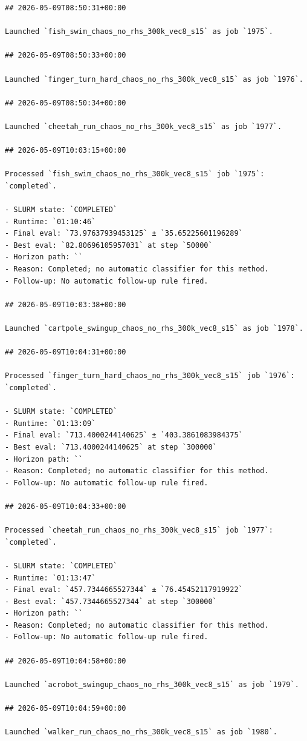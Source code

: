 \begin{verbatim}
## 2026-05-09T08:50:31+00:00

Launched `fish_swim_chaos_no_rhs_300k_vec8_s15` as job `1975`.

## 2026-05-09T08:50:33+00:00

Launched `finger_turn_hard_chaos_no_rhs_300k_vec8_s15` as job `1976`.

## 2026-05-09T08:50:34+00:00

Launched `cheetah_run_chaos_no_rhs_300k_vec8_s15` as job `1977`.

## 2026-05-09T10:03:15+00:00

Processed `fish_swim_chaos_no_rhs_300k_vec8_s15` job `1975`: `completed`.

- SLURM state: `COMPLETED`
- Runtime: `01:10:46`
- Final eval: `73.97637939453125` ± `35.65225601196289`
- Best eval: `82.80696105957031` at step `50000`
- Horizon path: ``
- Reason: Completed; no automatic classifier for this method.
- Follow-up: No automatic follow-up rule fired.

## 2026-05-09T10:03:38+00:00

Launched `cartpole_swingup_chaos_no_rhs_300k_vec8_s15` as job `1978`.

## 2026-05-09T10:04:31+00:00

Processed `finger_turn_hard_chaos_no_rhs_300k_vec8_s15` job `1976`: `completed`.

- SLURM state: `COMPLETED`
- Runtime: `01:13:09`
- Final eval: `713.4000244140625` ± `403.3861083984375`
- Best eval: `713.4000244140625` at step `300000`
- Horizon path: ``
- Reason: Completed; no automatic classifier for this method.
- Follow-up: No automatic follow-up rule fired.

## 2026-05-09T10:04:33+00:00

Processed `cheetah_run_chaos_no_rhs_300k_vec8_s15` job `1977`: `completed`.

- SLURM state: `COMPLETED`
- Runtime: `01:13:47`
- Final eval: `457.7344665527344` ± `76.45452117919922`
- Best eval: `457.7344665527344` at step `300000`
- Horizon path: ``
- Reason: Completed; no automatic classifier for this method.
- Follow-up: No automatic follow-up rule fired.

## 2026-05-09T10:04:58+00:00

Launched `acrobot_swingup_chaos_no_rhs_300k_vec8_s15` as job `1979`.

## 2026-05-09T10:04:59+00:00

Launched `walker_run_chaos_no_rhs_300k_vec8_s15` as job `1980`.


\end{verbatim}
